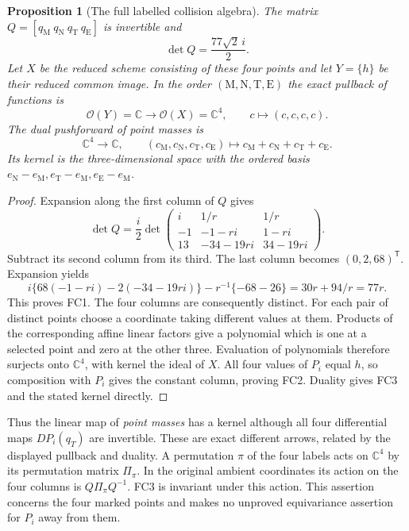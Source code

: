 \documentclass[11pt]{article}
\newtheorem{proposition}{Proposition}
\newcommand{\C}{\mathbb C}
\begin{document}
\begin{proposition}[The full labelled collision algebra]
The matrix $Q=[q_{\mathrm M}\ q_{\mathrm N}\ q_{\mathrm T}\ q_{\mathrm E}]$
is invertible and
\begin{equation}
 \det Q=\frac{77\sqrt2\,i}{2}.\tag{FC1}
\end{equation}
Let $X$ be the reduced scheme consisting of these four points and let
$Y=\{h\}$ be their reduced common image. In the order
$(\mathrm M,\mathrm N,\mathrm T,\mathrm E)$ the exact pullback of functions
is
\begin{equation}
 \mathcal O(Y)=\C\longrightarrow\mathcal O(X)=\C^4,
 \qquad c\longmapsto(c,c,c,c).\tag{FC2}
\end{equation}
The dual pushforward of point masses is
\begin{equation}
 \C^4\longrightarrow\C,\qquad
 (c_{\mathrm M},c_{\mathrm N},c_{\mathrm T},c_{\mathrm E})
 \longmapsto c_{\mathrm M}+c_{\mathrm N}+c_{\mathrm T}+c_{\mathrm E}.
 \tag{FC3}
\end{equation}
Its kernel is the three-dimensional space with the ordered basis
$e_{\mathrm N}-e_{\mathrm M},e_{\mathrm T}-e_{\mathrm M},
e_{\mathrm E}-e_{\mathrm M}$.
\end{proposition}
\begin{proof}
Expansion along the first column of $Q$ gives
\[
 \det Q=\frac i2\det\begin{pmatrix}
 i&1/r&1/r\\-1&-1-ri&1-ri\\13&-34-19ri&34-19ri
 \end{pmatrix}.
\]
Subtract its second column from its third. The last column becomes
$(0,2,68)^{\mathsf T}$. Expansion yields
\[
 i\{68(-1-ri)-2(-34-19ri)\}
 -r^{-1}\{-68-26\}=30r+94/r=77r.
\]
This proves FC1. The four columns are consequently distinct.
For each pair of distinct points choose a coordinate taking different
values at them. Products of the corresponding affine linear factors
give a polynomial which is one at a selected point and zero at the
other three. Evaluation of polynomials therefore surjects onto
$\C^4$, with kernel the ideal of $X$. All four values of $P_i$ equal
$h$, so composition with $P_i$ gives the constant column, proving FC2.
Duality gives FC3 and the stated kernel directly.
\end{proof}

Thus the linear map of \emph{point masses} has a kernel although all
four differential maps $DP_i(q_T)$ are invertible. These are exact
different arrows, related by the displayed pullback and duality. A
permutation $\pi$ of the four labels acts on $\C^4$ by its permutation
matrix $\Pi_\pi$. In the original ambient coordinates its action on
the four columns is $Q\Pi_\pi Q^{-1}$. FC3 is invariant under this
action. This assertion concerns the four marked points and makes no
unproved equivariance assertion for $P_i$ away from them.
\end{document}
